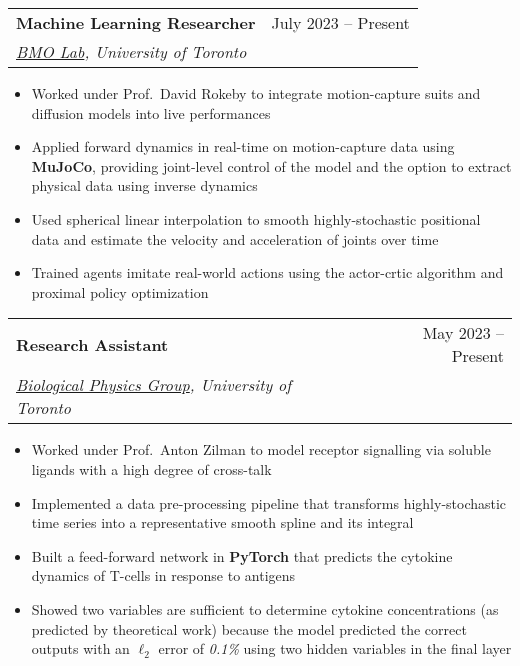 \documentclass[letterpaper,11pt]{article}
\makeatletter
\newcommand{\resumeItem}[1]{
  \item\small{
    {#1 \vspace{-2pt}}
  }
}
\newcommand{\resumeSubheading}[4]{
  \vspace{-2pt}\item
    \begin{tabular*}{0.97\textwidth}[t]{l@{\extracolsep{\fill}}r}
      \textbf{#1} & #2 \\
      \textit{\small#3} & \textit{\small #4} \\
    \end{tabular*}\vspace{-7pt}
}
\newcommand{\resumeItemListStart}{\begin{itemize}}
\newcommand{\resumeItemListEnd}{\end{itemize}\vspace{-5pt}}
\makeatother
\begin{document}
    \resumeSubheading
    {\small{Machine Learning Researcher} \href{https://github.com/ff-zhang/mocap-mujoco}{\footnotesize\faIcon{external-link-alt}}}{\small{July 2023 -- Present}}
    {\href{https://bmolab.artsci.utoronto.ca/}{BMO Lab}, University of Toronto}{}
      \resumeItemListStart
      \resumeItem{Worked under Prof.\ David Rokeby to integrate motion-capture suits and diffusion models into live performances}
      \resumeItem{Applied forward dynamics in real-time on motion-capture data using \textbf{MuJoCo}, providing joint-level control of the model and the option to extract physical data using inverse dynamics}
      \resumeItem{Used spherical linear interpolation to smooth highly-stochastic positional data and estimate the velocity and acceleration of joints over time}
      \resumeItem{Trained agents imitate real-world actions using the actor-crtic algorithm and proximal policy optimization}
      \resumeItemListEnd

      \resumeSubheading
      {\small{Research Assistant} \href{https://github.com/ff-zhang/t-cell-response-encoder/tree/master}{\footnotesize\faIcon{external-link-alt}}}{\small{May 2023 -- Present}}
      {\href{https://www.physics.utoronto.ca/~zilmana/}{Biological Physics Group}, University of Toronto}{}%
        \resumeItemListStart
        \resumeItem{Worked under Prof.\ Anton Zilman to model receptor signalling via soluble ligands with a high degree of cross-talk}
        \resumeItem{Implemented a data pre-processing pipeline that transforms highly-stochastic time series into a representative smooth spline and its integral}
        \resumeItem{Built a feed-forward network in \textbf{PyTorch} that predicts the cytokine dynamics of T-cells in response to antigens}
        \resumeItem{Showed two variables are sufficient to determine cytokine concentrations (as predicted by theoretical work) because the model predicted the correct outputs with an $\ell_2$ error of \emph{0.1\%} using two hidden variables in the final layer}
        \resumeItemListEnd
        
\end{document}
